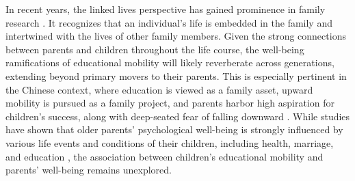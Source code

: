 In recent years, the linked lives perspective has gained prominence in family research \parencite{bengtsonLifecoursePerspectiveAgeing2005,elderFamiliesLivesDevelopments1987,elderFamilyHistoryLife1977,macmillanFamiliesLifeCourse2005}. It recognizes that an individual's life is embedded in the family and intertwined with the lives of other family members. Given the strong connections between parents and children throughout the life course, the well-being ramifications of educational mobility will likely reverberate across generations, extending beyond primary movers to their parents. This is especially pertinent in the Chinese context, where education is viewed as a family asset, upward mobility is pursued as a family project, and parents harbor high aspiration for children's success, along with deep-seated fear of falling downward \parencite{chenEducationFeverChina2021,guSacrificeIndebtednessIntergenerational2022,guSacrificeIndebtednessIntergenerational2022,mengWhenAnxiousMothers2020}. While studies have shown that older parents' psychological well-being is strongly influenced by various life events and conditions of their children, including health, marriage, and education \parencite{friedmanSchoolingOffspringSurvival2014,maDoesAdultChildrens2022,zhangChildrensTransitionsAdulthood2023}, the association between children's educational mobility and parents' well-being remains unexplored.

